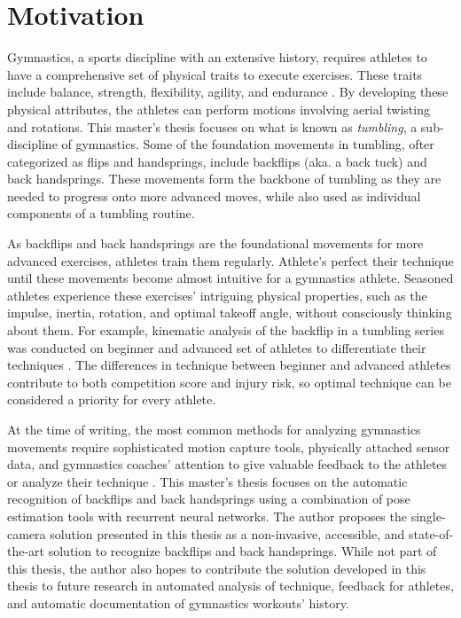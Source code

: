 \section{Motivation}

Gymnastics, a sports discipline with an extensive history, requires athletes to have a comprehensive set of physical traits to execute exercises. These traits include balance, strength, flexibility, agility, and endurance \cite{donham2007teaching}. By developing these physical attributes, the athletes can perform motions involving aerial twisting and rotations. This master's thesis focuses on what is known as \textit{tumbling}, a sub-discipline of gymnastics. Some of the foundation movements in tumbling, ofter categorized as flips and handsprings, include backflips (aka. a back tuck) and back handsprings. These movements form the backbone of tumbling as they are needed to progress onto more advanced moves, while also used as individual components of a tumbling routine.

As backflips and back handsprings are the foundational movements for more advanced exercises, athletes train them regularly. Athlete's perfect their technique until these movements become almost intuitive for a gymnastics athlete. Seasoned athletes experience these exercises' intriguing physical properties, such as the impulse, inertia, rotation, and optimal takeoff angle, without consciously thinking about them. For example, kinematic analysis of the backflip in a tumbling series was conducted on beginner and advanced set of athletes to differentiate their techniques \cite{Burgess2001KINEMATICAO}. The differences in technique between beginner and advanced athletes contribute to both competition score and injury risk, so optimal technique can be considered a priority for every athlete.

At the time of writing, the most common methods for analyzing gymnastics movements require sophisticated motion capture tools, physically attached sensor data, and gymnastics coaches' attention to give valuable feedback to the athletes or analyze their technique \cite{park2014kinematic} \cite{yamada2019dynamics}. This master's thesis focuses on the automatic recognition of backflips and back handsprings using a combination of pose estimation tools with recurrent neural networks. The author proposes the single-camera solution presented in this thesis as a non-invasive, accessible, and state-of-the-art solution to recognize backflips and back handsprings. While not part of this thesis, the author also hopes to contribute the solution developed in this thesis to future research in automated analysis of technique, feedback for athletes, and automatic documentation of gymnastics workouts' history.

